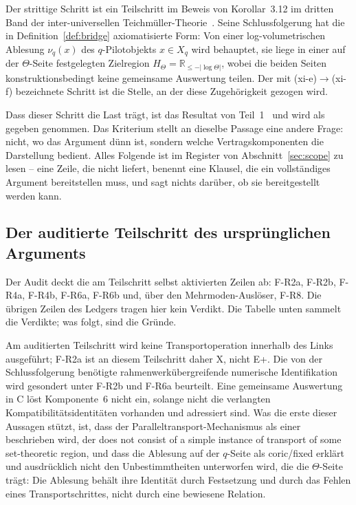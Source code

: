 \documentclass[11pt,a4paper]{article}
\begin{document}
Der strittige Schritt ist ein Teilschritt im Beweis von Korollar~3.12 im
dritten Band der inter-universellen
Teichmüller-Theorie~\cite{Mochizuki2021c}. Seine Schlussfolgerung hat die in
Definition~\ref{def:bridge} axiomatisierte Form: Von einer
log-volumetrischen Ablesung $\nu_q(x)$ des $q$-Pilotobjekts $x \in X_q$ wird
behauptet, sie liege in einer auf der $\Theta$-Seite festgelegten Zielregion
$H_\Theta = \mathbb{R}_{\le -|\log\Theta|}$, wobei die beiden Seiten
konstruktionsbedingt keine gemeinsame Auswertung teilen. Der mit
(xi-e)$\to$(xi-f) bezeichnete Schritt ist die Stelle, an der diese
Zugehörigkeit gezogen wird.

Dass dieser Schritt die Last trägt, ist das Resultat von
Teil~1~\cite{part1} und wird als gegeben genommen. Das Kriterium stellt an
dieselbe Passage eine andere Frage: nicht, wo das Argument dünn ist, sondern
welche Vertragskomponenten die Darstellung bedient. Alles Folgende ist im
Register von Abschnitt~\ref{sec:scope} zu lesen -- eine Zeile, die nicht
liefert, benennt eine Klausel, die ein vollständiges Argument bereitstellen
muss, und sagt nichts darüber, ob sie bereitgestellt werden kann.

\subsection{Der auditierte Teilschritt des ursprünglichen Arguments}\label{sec:abc-original}

Der Audit deckt die am Teilschritt selbst aktivierten Zeilen ab: F-R2a,
F-R2b, F-R4a, F-R4b, F-R6a, F-R6b und, über den Mehrmoden-Auslöser, F-R8.
Die übrigen Zeilen des Ledgers tragen hier kein Verdikt. Die Tabelle unten
sammelt die Verdikte; was folgt, sind die Gründe.

Am auditierten Teilschritt wird keine Transportoperation innerhalb des Links
ausgeführt; F-R2a ist an diesem Teilschritt daher X, nicht E+. Die von der
Schlussfolgerung benötigte rahmenwerkübergreifende numerische
Identifikation wird gesondert unter F-R2b und F-R6a beurteilt. Eine
gemeinsame Auswertung in C löst Komponente~6 nicht ein, solange nicht die
verlangten Kompatibilitätsidentitäten vorhanden und adressiert sind. Was die
erste dieser Aussagen stützt, ist, dass der Paralleltransport-Mechanismus
als einer beschrieben wird, der \glqq does not consist of a simple instance of
transport of some set-theoretic region\grqq{}, und dass die Ablesung auf der
$q$-Seite als \glqq coric\grqq{}/\glqq fixed\grqq{} erklärt und ausdrücklich nicht den
Unbestimmtheiten unterworfen wird, die die $\Theta$-Seite trägt: Die Ablesung
behält ihre Identität durch Festsetzung und durch das Fehlen eines
Transportschrittes, nicht durch eine bewiesene Relation.
\end{document}
